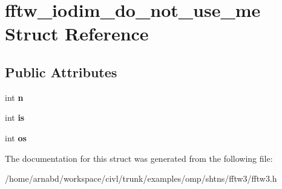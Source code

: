 \hypertarget{structfftw__iodim__do__not__use__me}{}\section{fftw\+\_\+iodim\+\_\+do\+\_\+not\+\_\+use\+\_\+me Struct Reference}
\label{structfftw__iodim__do__not__use__me}
\subsection*{Public Attributes}
\begin{DoxyCompactItemize}
\item 
\hypertarget{structfftw__iodim__do__not__use__me_aa9ceb61afc1731380bdb48305aa40ce0}{}int {\bfseries n}\label{structfftw__iodim__do__not__use__me_aa9ceb61afc1731380bdb48305aa40ce0}

\item 
\hypertarget{structfftw__iodim__do__not__use__me_a7571fd050be3b9c9486d41086b657099}{}int {\bfseries is}\label{structfftw__iodim__do__not__use__me_a7571fd050be3b9c9486d41086b657099}

\item 
\hypertarget{structfftw__iodim__do__not__use__me_acff6a6b2225f610d3bee5380e801abb4}{}int {\bfseries os}\label{structfftw__iodim__do__not__use__me_acff6a6b2225f610d3bee5380e801abb4}

\end{DoxyCompactItemize}


The documentation for this struct was generated from the following file\+:\begin{DoxyCompactItemize}
\item 
/home/arnabd/workspace/civl/trunk/examples/omp/shtns/fftw3/fftw3.\+h\end{DoxyCompactItemize}
